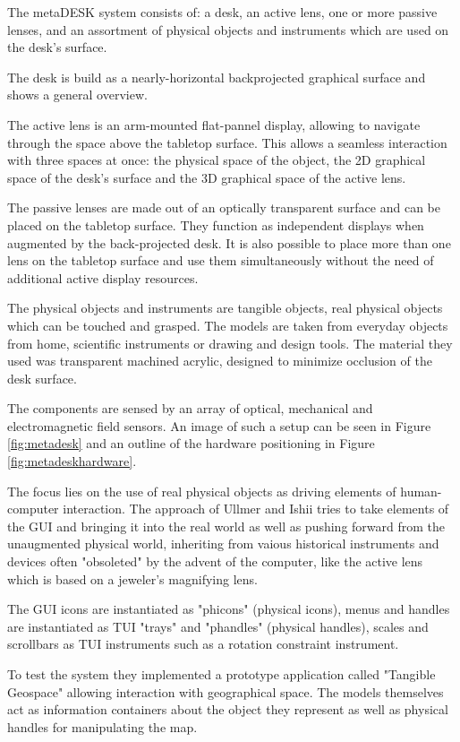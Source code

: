 The metaDESK system consists of: a desk, an active lens, one or more passive lenses, and an assortment of physical objects and instruments which are used on the desk's surface. 

The desk is build as a nearly-horizontal backprojected graphical surface and shows a general overview. 

The active lens is an arm-mounted flat-pannel display, allowing to navigate through the space above the tabletop surface. This allows a seamless interaction with three spaces at once: the physical space of the object, the 2D graphical space of the desk's surface and the 3D graphical space of the active lens.

The passive lenses are made out of an optically transparent surface and can be placed on the tabletop surface. They function as independent displays when augmented by the back-projected desk. It is also possible to place more than one lens on the tabletop surface and use them simultaneously without the need of additional active display resources.

The physical objects and instruments are tangible objects, real physical objects which can be touched and grasped. The models are taken from everyday objects from home, scientific instruments or drawing and design tools. The material they used was transparent machined acrylic, designed to minimize occlusion of the desk surface.

The components are sensed by an array of optical, mechanical and electromagnetic field sensors. An image of such a setup can be seen in Figure \ref{fig:metadesk} and an outline of the hardware positioning in Figure \ref{fig:metadeskhardware}.




The focus lies on the use of real physical objects as driving elements of human-computer interaction. The approach of Ullmer and Ishii tries to take elements of the GUI and bringing it into the real world as well as pushing forward from the unaugmented physical world, inheriting from vaious historical instruments and devices often "obsoleted" by the advent of the computer, like the active lens which is based on a jeweler's magnifying lens. 

The GUI icons are instantiated as "phicons" (physical icons), menus and handles are instantiated as TUI "trays" and "phandles" (physical handles), scales and scrollbars as TUI instruments such as a rotation constraint instrument. 

To test the system they implemented a prototype application called "Tangible Geospace" allowing interaction with geographical space.
The models themselves act as information containers about the object they represent as well as physical handles for manipulating the map.

